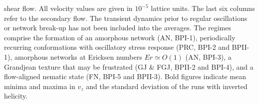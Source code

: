 \documentclass[8.5pt,twoside,twocolumn]{article}
\begin{document}
\begin{table}[htpb]
{shear flow. All velocity values are given in $10^{-5}$ lattice units. 
The last six columns refer to the secondary flow.
The transient dynamics
prior to regular oscillations or network break-up has not been included into the averages. 
The regimes comprise the formation of an amorphous network (AN, BPI-1), 
periodically recurring conformations with oscillatory stress response (PRC, BPI-2 and BPII-1), 
amorphous networks at Ericksen numbers ${Er\simeq O(1)}$ (AN, BPI-3), 
a Grandjean texture that may be frustrated (GJ \& FGJ, BPII-2 and BPI-4),
and a flow-aligned nematic state (FN, BPI-5 and BPII-3).
Bold figures indicate mean minima and maxima in $v_z$ and the standard deviation of the runs with 
inverted helicity. 
}
\label{tab1}
\end{table}

\footnotesize{
}
\end{document}
